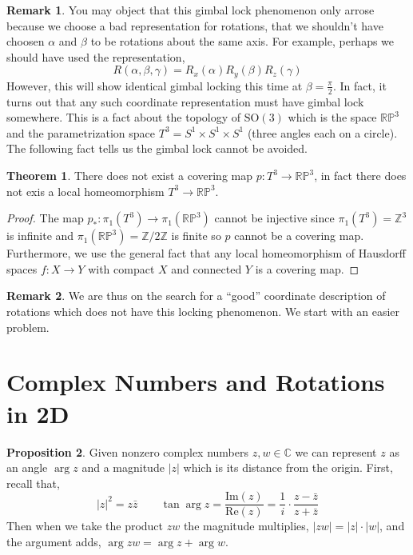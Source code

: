 \documentclass[12pt]{extarticle}
\newcommand{\Z}{\mathbb{Z}}
\renewcommand{\Im}[1]{\mathrm{Im}(#1)}
\newcommand{\rp}{\mathbb{RP}}
\theoremstyle{definition}
\newtheorem{theorem}{Theorem}[section]
\newtheorem{proposition}[theorem]{Proposition}
\newtheorem{remark}{Remark}
\newcommand{\SO}[1]{\mathrm{SO}\left(#1\right)}
\newcommand{\C}{\mathbb{C}}
\begin{document}
\begin{remark}
You may object that this gimbal lock phenomenon only arrose because we choose a bad representation for rotations, that we shouldn't have choosen $\alpha$ and $\beta$ to be rotations about the same axis. For example, perhaps we should have used the representation,
\[ R(\alpha, \beta, \gamma) = R_x(\alpha) R_y(\beta) R_z(\gamma) \]
However, this will show identical gimbal locking this time at $\beta = \tfrac{\pi}{2}$. In fact, it turns out that any such coordinate representation must have gimbal lock somewhere. This is a fact about the topology of $\SO{3}$ which is the space $\rp^3$ and the parametrization space $T^3 = S^1 \times S^1 \times S^1$ (three angles each on a circle). The following fact tells us the gimbal lock cannot be avoided.
\end{remark}

\begin{theorem}
There does not exist a covering map $p : T^3 \to \rp^3$, in fact there does not exis a local homeomorphism $T^3 \to \rp^3$. 
\end{theorem}

\begin{proof}
The map $p_* : \pi_1(T^3) \to \pi_1(\rp^3)$ cannot be injective since $\pi_1(T^3) = \Z^3 $ is infinite and $\pi_1(\rp^3) = \Z / 2 \Z$ is finite so $p$ cannot be a covering map.
\bigskip\\
Furthermore, we use the general fact that any local homeomorphism of Hausdorff spaces $f : X \to Y$ with compact $X$ and connected $Y$ is a covering map. 
\end{proof}

\begin{remark}
We are thus on the search for a ``good'' coordinate description of rotations which does not have this locking phenomenon. We start with an easier problem.
\end{remark}

\section{Complex Numbers and Rotations in 2D}

\renewcommand{\Re}[1]{\mathrm{Re}\left( #1 \right)}

\begin{proposition}
Given nonzero complex numbers $z, w \in \C$ we can represent $z$ as an angle $\arg{z}$ and a magnitude $|z|$ which is its distance from the origin. First, recall that,
\[ |z|^2 = z \bar{z} \quad \quad \tan{\arg{z}} = \frac{\Im{z}}{\Re{z}} = \frac{1}{i} \cdot \frac{z - \bar{z}}{z + \bar{z}} \]
Then when we take the product $zw$ the magnitude multiplies, $|zw| = |z| \cdot |w|$, and the argument adds, $\arg{zw} = \arg{z} + \arg{w}$. 
\end{proposition}
\end{document}
